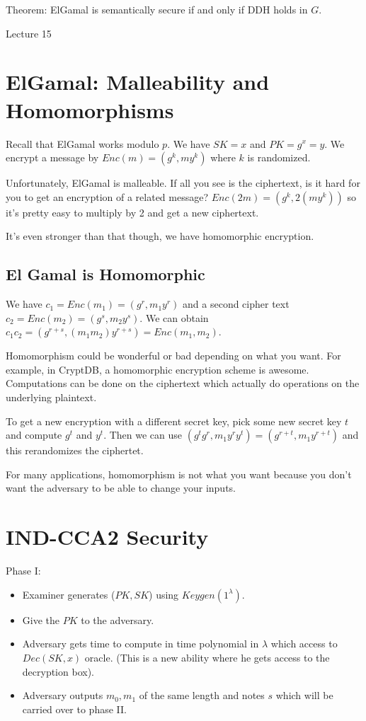\documentclass[psamsfonts]{amsart}
\begin{document}
Theorem: ElGamal is semantically secure if and only if DDH holds in $G$.


\newpage
\Large{Lecture 15}


\maketitle

\section{ElGamal: Malleability and Homomorphisms}

Recall that ElGamal works modulo $p$. We have $SK = x$ and $PK = g^x = y$. We encrypt a message by $Enc(m) = (g^k, m y^k)$ where $k$ is randomized.

Unfortunately, ElGamal is malleable. If all you see is the ciphertext, is it hard for you to get an encryption of a related message? $Enc(2m) = (g^k, 2 (m y^k))$ so it's pretty easy to multiply by 2 and get a new ciphertext.

It's even stronger than that though, we have homomorphic encryption.

\subsection{El Gamal is Homomorphic}

We have $c_1 = Enc(m_1) = (g^r, m_1 y^r)$ and a second cipher text $c_2 = Enc(m_2) = (g^s, m_2 y^s)$. We can obtain $c_1 c_2 = (g^{r+s}, (m_1 m_2) y^{r+s}) = Enc(m_1, m_2)$.

Homomorphism could be wonderful or bad depending on what you want. For example, in CryptDB, a homomorphic encryption scheme is awesome. Computations can be done on the ciphertext which actually do operations on the underlying plaintext.

To get a new encryption with a different secret key, pick some new secret key $t$ and compute $g^t$ and $y^t$. Then we can use $(g^t g^r, m_1 y^r y^t) = (g^{r+t}, m_1 y^{r+t})$ and this rerandomizes the ciphertet.

For many applications, homomorphism is not what you want because you don't want the adversary to be able to change your inputs.

\section{IND-CCA2 Security}

Phase I:
\begin{itemize}
  \item Examiner generates ($PK, SK$) using $Keygen(1^\lambda)$.
  \item Give the $PK$ to the adversary.
  \item Adversary gets time to compute in time polynomial in $\lambda$ which access to $Dec(SK, x)$ oracle. (This is a new ability where he gets access to the decryption box).
  \item Adversary outputs $m_0, m_1$ of the same length and notes $s$ which will be carried over to phase II.
\end{itemize}
\end{document}
